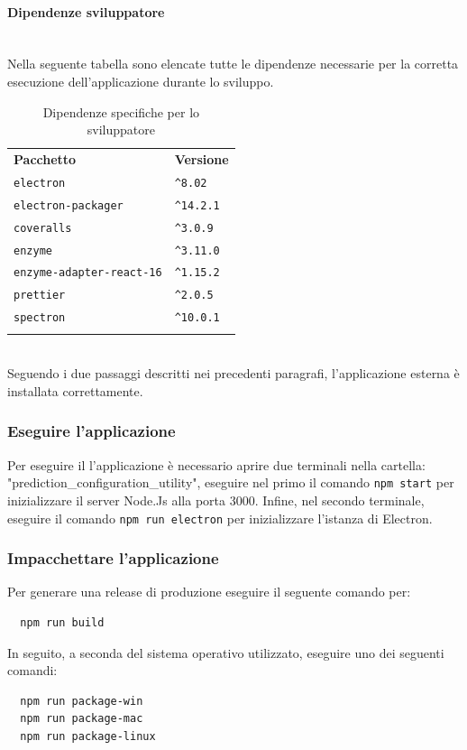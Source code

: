 \paragraph*{Dipendenze sviluppatore}\mbox{}\\ [1mm]
Nella seguente tabella sono elencate tutte le dipendenze necessarie per la corretta esecuzione dell'applicazione durante lo sviluppo.
	\setcounter{table}{1}
	\begin{longtable} {
		>{}p{65mm} 
		>{}p{30mm}
		}
    \rowcolor{gray!50}
    \textbf{Pacchetto} & \textbf{Versione} \TBstrut \\ [2mm]
    \verb|electron| & \verb|^8.02| \TBstrut \\ [2mm]
    \verb|electron-packager| & \verb|^14.2.1| \TBstrut \\ [2mm] 
    \verb|coveralls| & \verb|^3.0.9| \TBstrut \\ [2mm]
    \verb|enzyme| & \verb|^3.11.0| \TBstrut \\ [2mm]
    \verb|enzyme-adapter-react-16| & \verb|^1.15.2| \TBstrut \\ [2mm]
    \verb|prettier| & \verb|^2.0.5| \TBstrut \\ [2mm]
    \verb|spectron| & \verb|^10.0.1| \TBstrut \\ [2mm]
    \rowcolor{white}
    \caption{Dipendenze specifiche per lo sviluppatore}
    \end{longtable}
    \mbox{}\\ [1mm]
Seguendo i due passaggi descritti nei precedenti paragrafi, l'applicazione esterna è installata correttamente.

\subsubsection{Eseguire l'applicazione}%
Per eseguire il l'applicazione è necessario aprire due terminali nella cartella: "prediction\_configuration\_utility", eseguire nel primo il comando \verb|npm start| per inizializzare il server Node.Js alla porta 3000. Infine, nel secondo terminale, eseguire il comando \verb|npm run electron| per inizializzare l'istanza di Electron.

\subsubsection{Impacchettare l'applicazione}%
Per generare una release di produzione eseguire il seguente comando per:
\begin{verbatim}
  npm run build 
\end{verbatim}
In seguito, a seconda del sistema operativo utilizzato, eseguire uno dei seguenti comandi:
\begin{verbatim}
  npm run package-win
  npm run package-mac
  npm run package-linux
\end{verbatim}

